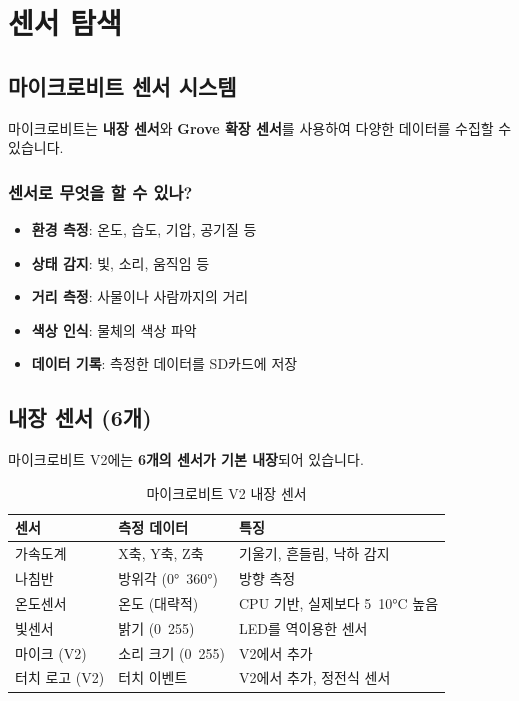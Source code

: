 \documentclass[11pt, a4paper]{article}
\begin{document}
\newpage

\section{센서 탐색}

\subsection{마이크로비트 센서 시스템}

마이크로비트는 \textbf{내장 센서}와 \textbf{Grove 확장 센서}를 사용하여 다양한 데이터를 수집할 수 있습니다.

\subsubsection{센서로 무엇을 할 수 있나?}

\begin{itemize}
  \item \textbf{환경 측정}: 온도, 습도, 기압, 공기질 등
  \item \textbf{상태 감지}: 빛, 소리, 움직임 등
  \item \textbf{거리 측정}: 사물이나 사람까지의 거리
  \item \textbf{색상 인식}: 물체의 색상 파악
  \item \textbf{데이터 기록}: 측정한 데이터를 SD카드에 저장
\end{itemize}

\subsection{내장 센서 (6개)}

마이크로비트 V2에는 \textbf{6개의 센서가 기본 내장}되어 있습니다.

\begin{table}[H]
\centering
\begin{tabularx}{\textwidth}{|l|l|X|}
\hline
\rowcolor{lightgray}
\textbf{센서} & \textbf{측정 데이터} & \textbf{특징} \\
\hline
가속도계 & X축, Y축, Z축 & 기울기, 흔들림, 낙하 감지 \\
\hline
나침반 & 방위각 (0°~360°) & 방향 측정 \\
\hline
온도센서 & 온도 (대략적) & CPU 기반, 실제보다 5~10°C 높음 \\
\hline
빛센서 & 밝기 (0~255) & LED를 역이용한 센서 \\
\hline
마이크 (V2) & 소리 크기 (0~255) & V2에서 추가 \\
\hline
터치 로고 (V2) & 터치 이벤트 & V2에서 추가, 정전식 센서 \\
\hline
\end{tabularx}
\caption{마이크로비트 V2 내장 센서}
\end{table}
\end{document}
